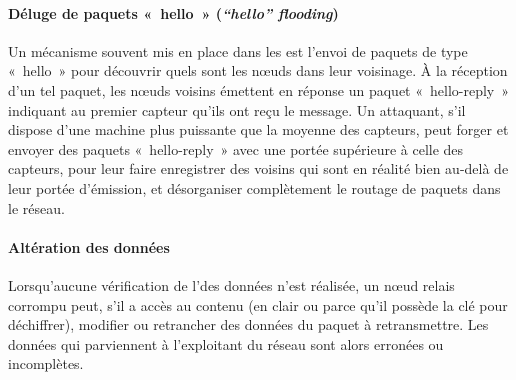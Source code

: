         \paragraph{Déluge de paquets « hello » (\textit{“hello” flooding})}
Un mécanisme souvent mis en place dans les \rcs est l'envoi de paquets de type « hello » pour découvrir quels sont les nœuds dans leur voisinage.
À la réception d'un tel paquet, les nœuds voisins émettent en réponse un paquet « hello-reply » indiquant au premier capteur qu'ils ont reçu le message.
Un attaquant, s'il dispose d'une machine plus puissante que la moyenne des capteurs, peut forger et envoyer des paquets « hello-reply » avec une portée supérieure à celle des capteurs, pour leur faire enregistrer des voisins qui sont en réalité bien au-delà de leur portée d'émission, et désorganiser complètement le routage de paquets dans le réseau.

        \paragraph{Altération des données}
Lorsqu'aucune vérification de l'\integrite des données n'est réalisée, un nœud relais corrompu peut, s'il a accès au contenu (en clair ou parce qu'il possède la clé pour déchiffrer), modifier ou retrancher des données du paquet à retransmettre.
Les données qui parviennent à l'exploitant du réseau sont alors erronées ou incomplètes.


